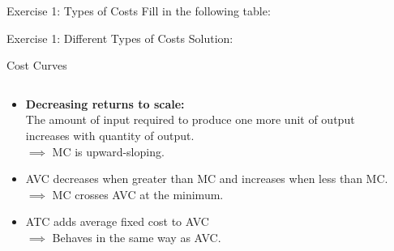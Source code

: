 \documentclass[9pt]{beamer}
\begin{document}
\begin{frame}{Exercise 1: Types of Costs}
    Fill in the following table: 
    
\end{frame}

\begin{frame}{Exercise 1: Different Types of Costs}
    Solution: 
    
\end{frame}

\begin{frame}{Cost Curves}
\begin{columns}[c]
    \begin{column}{0.5\textwidth}
        \begin{itemize}
            \item<1-> \textbf{Decreasing returns to scale:}\\
            The amount of input required to produce one more unit of output increases with quantity of output.\\
            $\implies$ MC is upward-sloping.
            \vspace{5pt}
            \item<2-> AVC decreases when greater than MC and increases when less than MC.\\
            $\implies$ MC crosses AVC at the minimum.
            \vspace{5pt}
            \item<3-> ATC adds average fixed cost to AVC\\
            $\implies$ Behaves in the same way as AVC.
        \end{itemize}
    \end{column}
    \begin{column}{0.5\textwidth}

\end{column}
\end{columns}
\end{frame}
\end{document}
